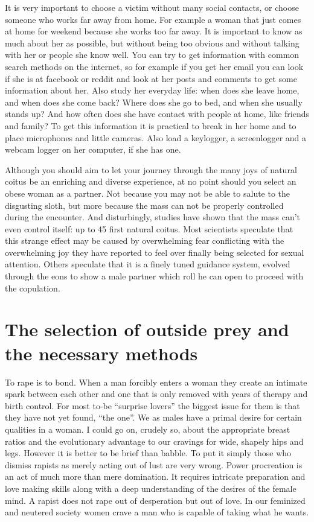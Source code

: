 It is very important to choose a victim without many social contacts, or choose 
someone who works far away from home. For example a woman that just comes at 
home for weekend because she works too far away. It is important to know as much 
about her as possible, but without being too obvious and without talking with 
her or people she know well. You can try to get information with common search 
methods on the internet, so for example if you get her email you can look if she 
is at facebook or reddit and look at her posts and comments to get some 
information about her. Also study her everyday life: when does she leave home, 
and when does she come back? Where does she go to bed, and when she usually 
stands up? And how often does she have contact with people at home, like friends 
and family? To get this information it is practical to break in her home and to 
place microphones and little cameras. Also load a keylogger, a screenlogger and 
a webcam logger on her computer, if she has one.


Although you should aim to let your journey through the many joys of natural 
coitus be an enriching and diverse experience, at no point should you select an 
obese woman as a partner. Not because you may not be able to salute to the 
disgusting sloth, but more because the mass can not be properly controlled 
during the encounter. And disturbingly, studies have shown that the mass can't 
even control itself: up to 45%
first natural coitus. Most scientists speculate that this strange effect may be 
caused by overwhelming fear conflicting with the overwhelming joy they have 
reported to feel over finally being selected for sexual attention. Others 
speculate that it is a finely tuned guidance system, evolved through the eons to 
show a male partner which roll he can open to proceed with the copulation.



\section*{The selection of outside prey and the necessary methods}


To rape is to bond. When a man forcibly enters a woman they create an intimate 
spark between each other and one that is only removed with years of therapy and 
birth control. For most to-be “surprise lovers” the biggest issue for them is 
that they have not yet found, “the one”. We as males have a primal desire for 
certain qualities in a woman. I could go on, crudely so, about the appropriate 
breast ratios and the evolutionary advantage to our cravings for wide, shapely 
hips and legs. However it is better to be brief than babble. To put it simply 
those who dismiss rapists as merely acting out of lust are very wrong. Power 
procreation is an act of much more than mere domination. It requires intricate 
preparation and love making skills along with a deep understanding of the 
desires of the female mind. A rapist does not rape out of desperation but out of 
love. In our feminized and neutered society women crave a man who is capable of 
taking what he wants.

